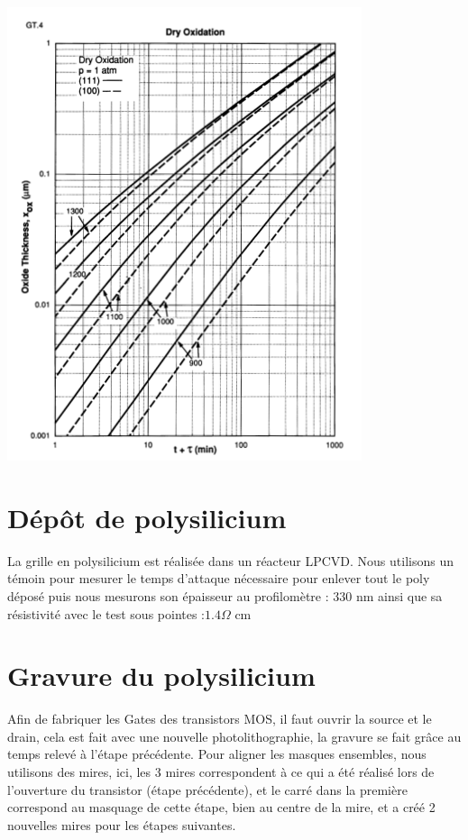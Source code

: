 \documentclass{article}
\begin{document}
\includegraphics[width=\linewidth]{gt4.png}

\section{Dépôt de polysilicium}

La grille en polysilicium est réalisée dans un réacteur LPCVD.
Nous utilisons un témoin pour mesurer le temps d’attaque nécessaire pour enlever tout le poly déposé puis nous mesurons son épaisseur au profilomètre : 330 nm ainsi que sa résistivité avec le test sous pointes :$ 1.4 \Omega$ cm

\section{Gravure du polysilicium}

Afin de fabriquer les Gates des transistors MOS, il faut ouvrir la source et le drain, cela est fait avec une nouvelle photolithographie, la gravure se fait grâce au temps relevé à l’étape précédente.
Pour aligner les masques ensembles, nous utilisons des mires, ici, les 3 mires correspondent à ce qui a été réalisé lors de l’ouverture du transistor (étape précédente), et le carré dans la première correspond au masquage de cette étape, bien au centre de la mire, et a créé 2 nouvelles mires pour les étapes suivantes.
\end{document}
